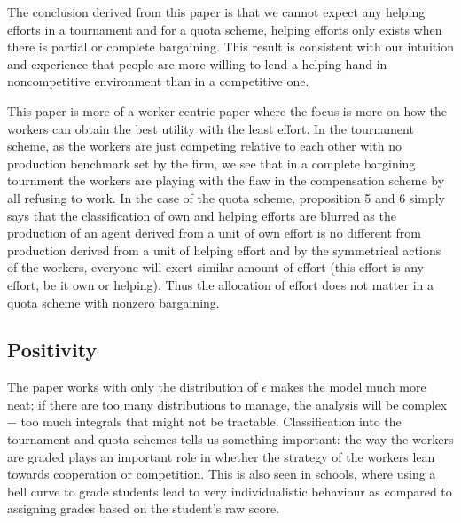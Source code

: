 \documentclass[a4paper,10pt]{article}
\theoremstyle{definition}
\begin{document}
The conclusion derived from this paper is that we cannot expect any helping efforts in a tournament and for a quota scheme, helping efforts only exists when there is partial or complete bargaining. This result is consistent with our intuition and experience that people are more willing to lend a helping hand in noncompetitive environment than in a competitive one.


This paper is more of a worker-centric paper where the focus is more on how the workers can obtain the best utility with the least effort. In the tournament scheme, as the workers are just competing relative to each other with no production benchmark set by the firm, we see that in a complete bargining tournment the workers are playing with the flaw in the compensation scheme by all refusing to work. In the case of the quota scheme, proposition 5 and 6 simply says that the classification of own and helping efforts are blurred as the production of an agent derived from a unit of own effort is no different from production derived from a unit of helping effort and by the symmetrical actions of the workers, everyone will exert similar amount of effort (this effort is any effort, be it own or helping). Thus the allocation of effort does not matter in a quota scheme with nonzero bargaining. 


 


\subsection*{Positivity}

The paper works with only the distribution of $\epsilon$ makes the model much more neat; if there are too many distributions to manage, the analysis will be complex $-$ too much integrals that might not be tractable. Classification into the tournament and quota schemes tells us something important: the way the workers are graded plays an important role in whether the strategy of the workers lean towards cooperation or competition. This is also seen in schools, where using a bell curve to grade students lead to very individualistic behaviour as compared to assigning grades based on the student's raw score. 
\end{document}
